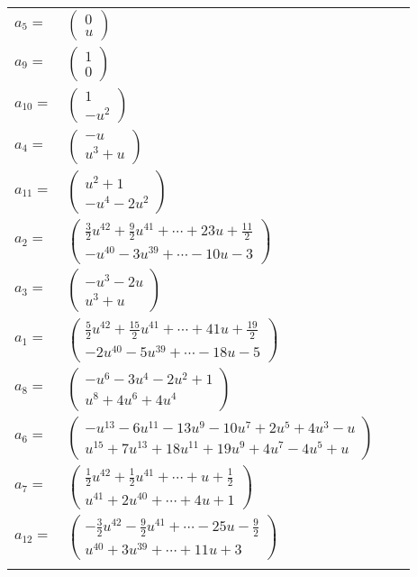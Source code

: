 \documentclass[1p]{elsarticle_modified}
\theoremstyle{definition}
\begin{document}
\begin{tabular}{m{7pt} m{180pt} m{7pt} m{180pt} }
\flushright $a_{5}=$&$\begin{pmatrix}0\\u\end{pmatrix}$ \\
\flushright $a_{9}=$&$\begin{pmatrix}1\\0\end{pmatrix}$ \\
\flushright $a_{10}=$&$\begin{pmatrix}1\\- u^2\end{pmatrix}$ \\
\flushright $a_{4}=$&$\begin{pmatrix}- u\\u^3+u\end{pmatrix}$ \\
\flushright $a_{11}=$&$\begin{pmatrix}u^2+1\\- u^4-2 u^2\end{pmatrix}$ \\
\flushright $a_{2}=$&$\begin{pmatrix}\frac{3}{2} u^{42}+\frac{9}{2} u^{41}+\cdots+23 u+\frac{11}{2}\\- u^{40}-3 u^{39}+\cdots-10 u-3\end{pmatrix}$ \\
\flushright $a_{3}=$&$\begin{pmatrix}- u^3-2 u\\u^3+u\end{pmatrix}$ \\
\flushright $a_{1}=$&$\begin{pmatrix}\frac{5}{2} u^{42}+\frac{15}{2} u^{41}+\cdots+41 u+\frac{19}{2}\\-2 u^{40}-5 u^{39}+\cdots-18 u-5\end{pmatrix}$ \\
\flushright $a_{8}=$&$\begin{pmatrix}- u^6-3 u^4-2 u^2+1\\u^8+4 u^6+4 u^4\end{pmatrix}$ \\
\flushright $a_{6}=$&$\begin{pmatrix}- u^{13}-6 u^{11}-13 u^9-10 u^7+2 u^5+4 u^3- u\\u^{15}+7 u^{13}+18 u^{11}+19 u^9+4 u^7-4 u^5+u\end{pmatrix}$ \\
\flushright $a_{7}=$&$\begin{pmatrix}\frac{1}{2} u^{42}+\frac{1}{2} u^{41}+\cdots+u+\frac{1}{2}\\u^{41}+2 u^{40}+\cdots+4 u+1\end{pmatrix}$ \\
\flushright $a_{12}=$&$\begin{pmatrix}-\frac{3}{2} u^{42}-\frac{9}{2} u^{41}+\cdots-25 u-\frac{9}{2}\\u^{40}+3 u^{39}+\cdots+11 u+3\end{pmatrix}$\\&\end{tabular}
\end{document}

